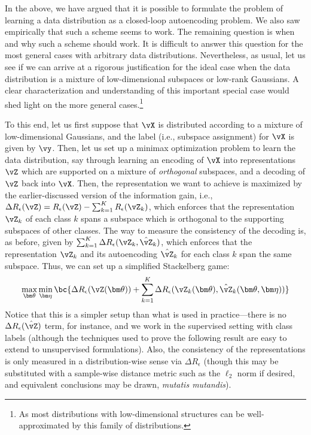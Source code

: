 \documentclass[../../book-main.tex]{subfiles}
\begin{document}
In the above, we have argued that it is possible to formulate the
problem of learning a data distribution as a closed-loop autoencoding
problem. We also saw empirically that such a scheme seems to work.
The remaining question is when and why such a scheme should work. It
is difficult to answer this question for the most general cases with
arbitrary data distributions. Nevertheless, as usual, let us see if
we can arrive at a rigorous justification for the ideal case when the
data distribution is a mixture of low-dimensional subspaces or
low-rank Gaussians. A clear characterization and understanding of
this important special case would shed light on the more general
cases.\footnote{As most distributions with low-dimensional structures
can be well-approximated by this family of distributions.}

To this end, let us first suppose that \(\vX\) is distributed
according to a mixture of low-dimensional Gaussians, and the label
(i.e., subspace assignment) for \(\vX\) is given by \(\vy\). Then,
let us set up a minimax optimization problem to learn the data
distribution, say through learning an encoding of \(\vX\) into
representations \(\vZ\) which are supported on a mixture of
\textit{orthogonal} subspaces, and a decoding of \(\vZ\) back into
\(\vX\). Then, the representation we want to achieve is maximized by
the earlier-discussed version of the information gain, i.e., \(
    \Delta R_{\epsilon}(\vZ) = R_{\epsilon}(\vZ) - \sum_{k=1}^K
R_{\epsilon}(\vZ_{k}) \), which enforces that the representation
\(\vZ_{k}\) of each class \(k\) spans a subspace which is orthogonal
to the supporting subspaces of other classes. The way to measure the
consistency of the decoding is, as before, given by \(\sum_{k =
1}^{K}\Delta R_\epsilon(\vZ_{k}, \hat{\vZ}_{k})\), which enforces
that the representation \(\vZ_{k}\) and its autoencoding
\(\hat{\vZ}_{k}\) for each class \(k\) span the same subspace. Thus,
we can set up a simplified Stackelberg game:
\begin{equation}\label{eq:ctrl_msp_game}
    \max_{\bm \theta}\min_{\bm \eta}\bc{\Delta R_\epsilon(\vZ(\bm
        \theta)) + \sum_{k = 1}^{K}\Delta R_\epsilon(\vZ_{k}(\bm \theta),
    \hat{\vZ}_{k}(\bm \theta, \bm \eta))}
\end{equation}
Notice that this is a simpler setup than what is used in
practice---there is no \(\Delta R_\epsilon(\hat{\vZ})\) term, for
instance, and we work in the supervised setting with class labels
(although the techniques used to prove the following result are easy
to extend to unsupervised formulations). Also, the consistency of the
representations is only measured in a distribution-wise sense via
\(\Delta R_\epsilon\) (though this may be substituted with a
    sample-wise distance metric such as the \(\ell_{2}\) norm if desired,
and equivalent conclusions may be drawn, \textit{mutatis mutandis}).
\end{document}

